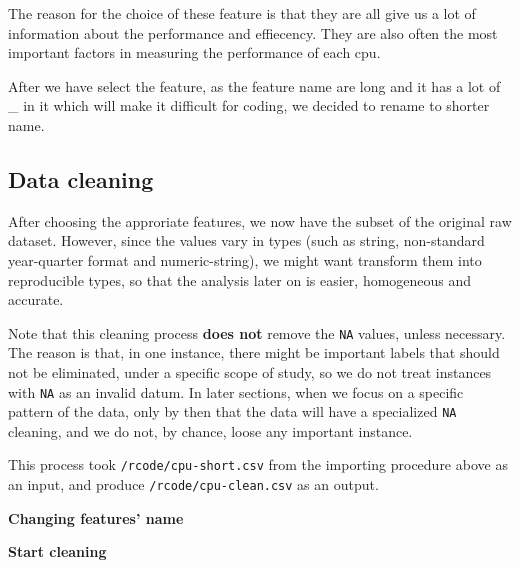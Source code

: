 The reason for the choice of these feature is that they are all give us a lot of information about the performance and effiecency. They are also often the most important factors in measuring the performance of each cpu.


After we have select the feature, as the feature name are long and it has a lot of \_ in it which will make it difficult for coding, we decided to rename to shorter name.













\subsection{Data cleaning}
After choosing the approriate features, we now have the subset of the original raw dataset. 
However, since the values vary in types (such as string, non-standard year-quarter format and numeric-string),
we might want transform them into reproducible types, so that the analysis later on is easier, homogeneous and accurate.

Note that this cleaning process \textbf{does not} remove the \texttt{NA} values, unless necessary. The reason is that, 
in one instance, there might be important labels that should not be eliminated, under a specific scope of study, so we do not treat 
instances with \texttt{NA} as an invalid datum. In later sections, when we focus on a specific pattern of the data, only by then
that the data will have a specialized \texttt{NA} cleaning, and we do not, by chance, loose any important instance.

This process took \verb|/rcode/cpu-short.csv| from the importing procedure above as an input, and produce \verb|/rcode/cpu-clean.csv| as
an output.



\textbf{Changing features' name}



\textbf{Start cleaning}

